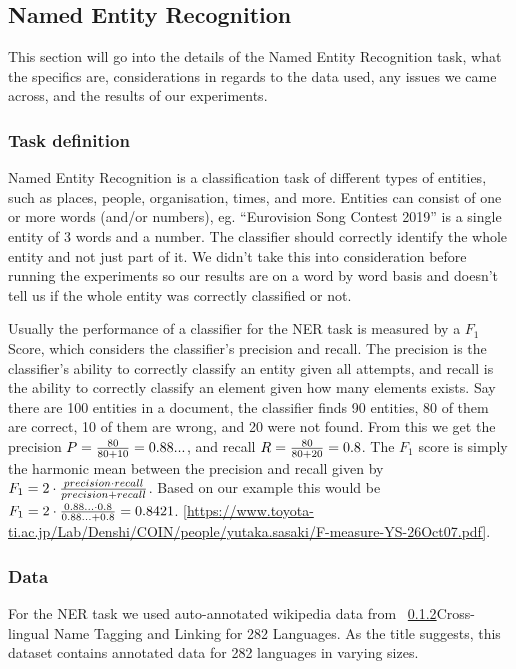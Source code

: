 

\subsection{Named Entity Recognition}

This section will go into the details of the Named Entity Recognition task, what
the specifics are, considerations in regards to the data used, any issues we
came across, and the results of our experiments.

\subsubsection{Task definition}

Named Entity Recognition is a classification task of different types of
entities, such as places, people, organisation, times, and more. Entities can
consist of one or more words (and/or numbers), eg. ``Eurovision Song Contest
2019'' is a single entity of 3 words and a number. The classifier should
correctly identify the whole entity and not just part of it. We didn't take this
into consideration before running the experiments so our results are on a word
by word basis and doesn't tell us if the whole entity was correctly classified
or not.

Usually the performance of a classifier for the NER task is measured by a $F_1$
Score, which considers the classifier's precision and recall. The precision is
the classifier's ability to correctly classify an entity given all attempts, and
recall is the ability to correctly classify an element given how many elements
exists. Say there are 100 entities in a document, the classifier finds 90
entities, 80 of them are correct, 10 of them are wrong, and 20 were not found.
From this we get the precision $P = {80 \over 80 + 10} = 0.88...$, and recall $R
= {80 \over 80 + 20} = 0.8$. The $F_1$ score is simply the harmonic mean between
the precision and recall given by $F_1 = 2 \cdot {precision \cdot recall \over
precision + recall}$. Based on our example this would be $F_1 = 2 \cdot {0.88...
\cdot 0.8 \over 0.88... + 0.8} = 0.8421$.
\ref{https://www.toyota-ti.ac.jp/Lab/Denshi/COIN/people/yutaka.sasaki/F-measure-YS-26Oct07.pdf}.


\subsubsection{Data}

For the NER task we used auto-annotated wikipedia data from
~\ref{}{Cross-lingual Name Tagging and Linking for 282 Languages}. As the title
suggests, this dataset contains annotated data for 282 languages in varying
sizes. 

